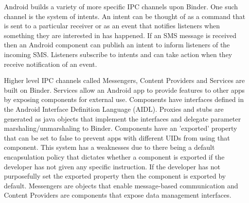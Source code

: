 Android builds a variety of more specific IPC channels upon Binder.  One such channel is the system of intents.  An intent can be thought of as a command that is sent to a particular receiver or as an event that notifies listeners when something they are interested in has happened.  If an SMS message is received then an Android component can publish an intent to inform listeners of the incoming SMS.  Listeners subscribe to intents and can take action when they receive notification of an event.

Higher level IPC channels called Messengers, Content Providers and Services are built on Binder.  Services allow an Android app to provide features to other apps by exposing components for external use.  Components have interfaces defined in the Android Interface Definition Language (AIDL).  Proxies and stubs are generated as java objects that implement the interfaces and delegate parameter marshaling/unmarshaling to Binder.  Components have an 'exported' property that can be set to false to prevent apps with different UIDs from using that component.  This system has a weaknesses due to there being a default encapsulation policy that dictates whether a component is exported if the developer has not given any specific instruction.  If the developer has not purposefully set the exported property then the component is exported by default.  Messengers are objects that enable message-based communication and Content Providers are components that expose data management interfaces.  



